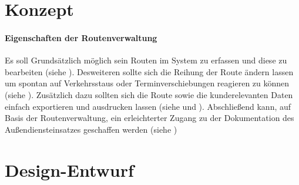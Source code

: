 \documentclass[Bachelorarbeit.tex]{subfiles}
\begin{document}

\section{Konzept}
\label{chap:entwicklung:sec:konzept}


\paragraph{Eigenschaften der Routenverwaltung}

Es soll Grundsätzlich möglich sein Routen im System zu erfassen und diese zu bearbeiten (siehe ).
Desweiteren sollte sich die Reihung der Route ändern lassen um spontan auf Verkehrsstaus oder Terminverschiebungen reagieren zu können (siehe ).
Zusätzlich dazu sollten sich die Route sowie die kunderelevanten Daten einfach exportieren und ausdrucken lassen (siehe  und ). 
Abschließend kann, auf Basis der Routenverwaltung, ein erleichterter Zugang zu der Dokumentation des Außendiensteinsatzes geschaffen werden (siehe )

\section{Design-Entwurf}
\label{chap:entwicklung:sec:design_entwurf}
\end{document}
